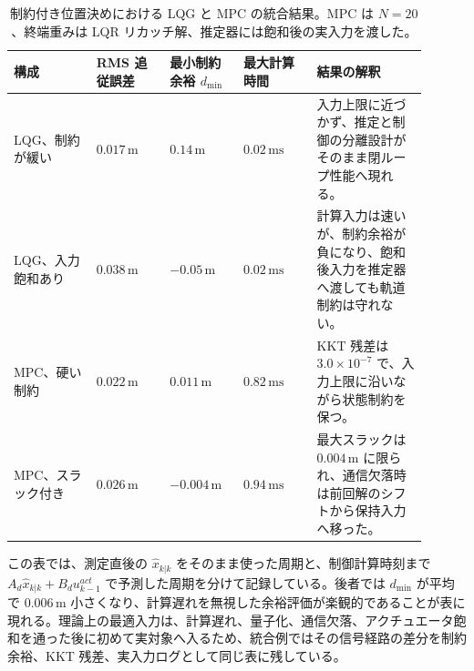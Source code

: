 \begin{table}[tb]
  \centering
  \footnotesize
  \caption{制約付き位置決めにおける LQG と MPC の統合結果。MPC は $N=20$、終端重みは LQR リカッチ解、推定器には飽和後の実入力を渡した。}
  \label{tab:w08-lqg-mpc-results}
  \begin{tabular}{@{}>{\raggedright\arraybackslash}p{0.18\linewidth}>{\raggedright\arraybackslash}p{0.16\linewidth}>{\raggedright\arraybackslash}p{0.16\linewidth}>{\raggedright\arraybackslash}p{0.16\linewidth}>{\raggedright\arraybackslash}p{0.24\linewidth}@{}}
    \hline
    構成 & RMS 追従誤差 & 最小制約余裕 $d_{\min}$ & 最大計算時間 & 結果の解釈 \\
    \hline
    LQG、制約が緩い &
    $0.017\,\mathrm{m}$ &
    $0.14\,\mathrm{m}$ &
    $0.02\,\mathrm{ms}$ &
    入力上限に近づかず、推定と制御の分離設計がそのまま閉ループ性能へ現れる。 \\
    LQG、入力飽和あり &
    $0.038\,\mathrm{m}$ &
    $-0.05\,\mathrm{m}$ &
    $0.02\,\mathrm{ms}$ &
    計算入力は速いが、制約余裕が負になり、飽和後入力を推定器へ渡しても軌道制約は守れない。 \\
    MPC、硬い制約 &
    $0.022\,\mathrm{m}$ &
    $0.011\,\mathrm{m}$ &
    $0.82\,\mathrm{ms}$ &
    KKT 残差は $3.0\times10^{-7}$ で、入力上限に沿いながら状態制約を保つ。 \\
    MPC、スラック付き &
    $0.026\,\mathrm{m}$ &
    $-0.004\,\mathrm{m}$ &
    $0.94\,\mathrm{ms}$ &
    最大スラックは $0.004\,\mathrm{m}$ に限られ、通信欠落時は前回解のシフトから保持入力へ移った。 \\
    \hline
  \end{tabular}
\end{table}

この表では、測定直後の $\hat{x}_{k|k}$ をそのまま使った周期と、制御計算時刻まで $A_d\hat{x}_{k|k}+B_du_{k-1}^{act}$ で予測した周期を分けて記録している。後者では $d_{\min}$ が平均で $0.006\,\mathrm{m}$ 小さくなり、計算遅れを無視した余裕評価が楽観的であることが表に現れる。理論上の最適入力は、計算遅れ、量子化、通信欠落、アクチュエータ飽和を通った後に初めて実対象へ入るため、統合例ではその信号経路の差分を制約余裕、KKT 残差、実入力ログとして同じ表に残している。

